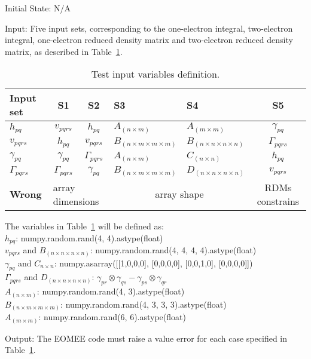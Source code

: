 \documentclass[12pt, titlepage]{article}
\begin{document}
\begin{enumerate}
Initial State: N/A
					
Input: Five input sets, corresponding to the one-electron integral, 
two-electron integral, one-electron reduced density matrix and two-electron 
reduced density matrix, as described in Table~\ref{Table:valueerror}.
\begin{table}[h!]
	\centering
	\noindent \begin{tabular}{l c c l l c} 
		\toprule		
		\textbf{Input set} & \textbf{S1} & \textbf{S2}& 
		\textbf{S3} & \textbf{S4}& \textbf{S5}\\
		\midrule 
		$h_{pq}$& $v_{pqrs}$ & $h_{pq}$& $A_{(n \times m)}$& 
		$A_{(m \times m)}$& $\gamma_{pq}$\\
		$v_{pqrs}$& $h_{pq}$& $v_{pqrs}$&$B_{(n \times m 
		\times m \times m)}$& $B_{(n \times n 
		\times n \times n)}$& $\Gamma_{pqrs}$\\
		$\gamma_{pq}$& $\gamma_{pq}$& $\Gamma_{pqrs}$& $A_{(n \times m)}$& 
		$C_{(n \times n)}$& $h_{pq}$ 
		\\
		$\Gamma_{pqrs}$& $\Gamma_{pqrs}$& $\gamma_{pq}$&$B_{(n \times m \times 
		m \times m)}$& $D_{(n \times n \times n \times 
		n)}$& $v_{pqrs}$\\
		\textbf{Wrong}& \multicolumn{2}{l}{array dimensions} 
		&\multicolumn{2}{c}{array shape} & RDMs constrains\\
		\bottomrule
	\end{tabular}
	\caption{Test input variables definition.}
	\label{Table:valueerror}
\end{table}

The variables in Table~\ref{Table:valueerror} will be defined as:\\
$h_{pq}$: numpy.random.rand(4, 4).astype(float)\\
$v_{pqrs}$ and $B_{(n \times n	\times n \times n)}$: numpy.random.rand(4, 4, 
4, 4).astype(float)\\
$\gamma_{pq}$ and $C_{n \times n}$: numpy.asarray([[1,0,0,0], [0,0,0,0], 
[0,0,1,0], [0,0,0,0]])\\
$\Gamma_{pqrs}$ and $D_{(n \times n	\times n \times n)}$: $\gamma_{pr} \otimes 
\gamma_{qs} -  \gamma_{ps} \otimes 
\gamma_{qr}$\\
$A_{(n \times m)}$: numpy.random.rand(4, 3).astype(float)\\
$B_{(n \times m	\times m \times m)}$: numpy.random.rand(4, 3, 3, 
3).astype(float)\\
$A_{(m \times m)}$: numpy.random.rand(6, 6).astype(float)

Output: The EOMEE code must raise a value error for each case specified in 
Table~\ref{Table:valueerror}.


\end{enumerate}
\end{document}
